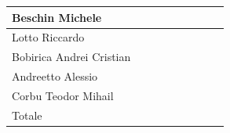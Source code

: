 \begin{itemize}
\begin{longtable}{|p{}|c|c|c|c|c|c|c|c|}
                \hline
                Beschin Michele & & & & & & & & \\
                \hline
                Lotto \newline Riccardo & & & & & & & & \\
                \hline
                Bobirica Andrei Cristian & & & & & & & & \\
                \hline
                Andreetto Alessio & & & & & & & & \\
                \hline
                Corbu Teodor Mihail & & & & & & & & \\
                \hline
                Totale & & & & & & & & \\
                \hline
            \end{longtable}
            \end{itemize}